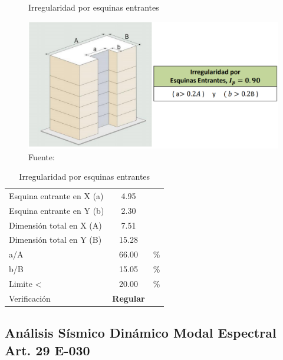 \begin{figure}[h!]
    \centering
    \caption{Irregularidad por esquinas entrantes}
    \includegraphics[scale=0.7]{IMAGENES/19.PNG}
    \caption*{\small Fuente: \it \cite{comen}}
    \label{fig:my_label}
\end{figure}

\begin{table}[h!]
  \centering
  \caption{Irregularidad por esquinas entrantes}
    \begin{tabular}{|ll|c|r}
\cline{1-3}    \multicolumn{2}{|l|}{Esquina entrante en X (a)} & 4.95  &  \\
\cline{1-3}    \multicolumn{2}{|l|}{Esquina entrante en Y (b)} & 2.30  &  \\
\cline{1-3}    \multicolumn{2}{|l|}{Dimensión total en X (A)} & 7.51  &  \\
\cline{1-3}    \multicolumn{2}{|l|}{Dimensión total en Y (B)} & 15.28 &  \\
\cline{1-3}    \multicolumn{2}{|l|}{a/A} & 66.00 & \multicolumn{1}{l}{\%} \\
\cline{1-3}    \multicolumn{2}{|l|}{b/B} & 15.05 & \multicolumn{1}{l}{\%} \\
\cline{1-3}    \multicolumn{2}{|l|}{Limite <} & 20.00 & \multicolumn{1}{l}{\%} \\
\cline{1-3}    \multicolumn{2}{|l|}{Verificación} & \textcolor[rgb]{ .267,  .447,  .769}{\textbf{Regular}} &  \\
\cline{1-3}    \end{tabular}%
  \label{tab:addlabel}%
\end{table}%


\subsection{Análisis Sísmico Dinámico Modal Espectral Art. 29 E-030}


